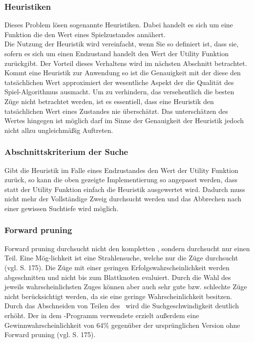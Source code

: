 \subsubsection{Heuristiken}
Dieses Problem lösen sogenannte Heuristiken. Dabei handelt es sich um eine Funktion die den Wert eines Spielzustandes annähert.
\\
Die Nutzung der Heuristik wird vereinfacht, wenn Sie so definiert ist, dass sie, sofern es sich um einen Endzustand handelt den Wert der Utility Funktion zurückgibt. Der Vorteil dieses Verhaltens wird im nächsten Abschnitt betrachtet.\\
Kommt eine Heuristik zur Anwendung so ist die Genauigkeit mit der diese den tatsächlichen Wert approximiert der wesentliche Aspekt der die Qualität des Spiel-Algorithmus ausmacht. Um zu verhindern, das versehentlich die besten Züge nicht betrachtet werden, ist es essentiell, dass eine Heuristik den tatsächlichen Wert eines Zustandes nie überschätzt. Das unterschätzen des Wertes hingegen ist möglich darf im Sinne der Genauigkeit der Heuristik jedoch nicht allzu ungleichmäßig Auftreten.

\subsubsection{Abschnittskriterium der Suche}
Gibt die Heuristik im Falle eines Endzustandes den Wert der Utility Funktion zurück, so kann die oben gezeigte Implementierung so angepasst werden, dass statt der Utility Funktion einfach die Heuristik ausgewertet wird. Dadurch muss nicht mehr der Vollständige Zweig durchsucht werden und das Abbrechen nach einer gewissen Suchtiefe wird möglich.
 
\subsubsection{Forward pruning}
Forward pruning durchsucht nicht den kompletten \gtree , sondern durchsucht nur einen Teil. Eine Mög-lichkeit ist eine Strahlensuche, welche nur die  Züge durchsucht (vgl. \cite{Russell.2016} S. 175). Die Züge mit einer geringen Erfolgswahrscheinlichkeit werden abgeschnitten und nicht bis zum Blattknoten evaluiert. Durch die Wahl des jeweils wahrscheinlichsten Zuges können aber auch sehr gute bzw. schlechte Züge nicht berücksichtigt werden, da sie eine geringe Wahrscheinlichkeit besitzen. Durch das Abschneiden von Teilen des \gtree\ wird die Suchgeschwindigkeit deutlich erhöht. Der in dem \ot -Programm  verwendete  erzielt außerdem eine Gewinnwahrscheinlichkeit von 64\% gegenüber der ursprünglichen Version ohne Forward pruning (vgl. \cite{Russell.2016} S. 175).
